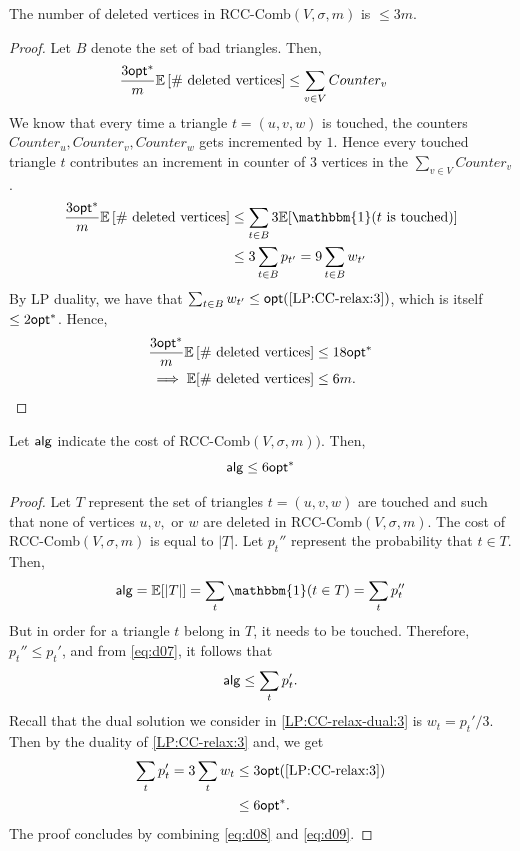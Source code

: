 \begin{lemma}\label{RCC:l3}
The number of deleted vertices in {\sf RCC-Comb}$(V,\sigma,m)$ is $\leq 3m$.
\end{lemma}
\begin{proof}
Let $B$ denote the set of bad triangles. Then,
\begin{align}
    \frac{3\mathsf{opt}^*}{m} \mathbb{E}\left[\# \text{ deleted vertices}\right] &\leq \sum_{v\in V}Counter_v \nonumber
\end{align}
We know that every time a triangle $t=(u,v,w)$ is touched, the counters $Counter_u, Counter_v, Counter_w$ gets incremented by $1$. Hence every touched triangle $t$ contributes an increment in counter of $3$ vertices in the $\sum_{v\in V}Counter_v$.
\begin{align}
    \frac{3\opt^*}{m} \mathbb{E}\left[\# \text{ deleted vertices}\right] &\leq \sum_{t\in B}3\mathbb{E}[\mathbbm{1}(t\text{ is touched})] \nonumber\\
    & \leq 3\sum_{t\in B}p_{t'} = 9\sum_{t\in B}w_{t'} \nonumber
\end{align}
By LP duality, we have that $\sum_{t\in B}w_{t'} \leq \mathsf{opt}(\ref{LP:CC-relax:3})$, which is itself $\leq 2\mathsf{opt}^*$. Hence,
\begin{align}
    \frac{3\mathsf{opt}^*}{m} \mathbb{E}\left[\# \text{ deleted vertices}\right] &\leq 18\mathsf{opt}^* \nonumber \\
    \implies \mathbb{E}[\# \text{ deleted vertices}] &\leq 6m. \nonumber
\end{align}
\end{proof}

\begin{lemma}\label{RCC:l4}
Let $\mathsf{alg}$ indicate the cost of {\sf RCC-Comb}$(V,\sigma,m))$. Then,
\begin{equation*}
    \mathsf{alg} \le 6\mathsf{opt}^*
\end{equation*}
\end{lemma}
\begin{proof}
Let $T$ represent the set of triangles $t = (u,v,w)$ are touched and such that none of vertices $u,v,$ or $w$ are deleted in {\sf RCC-Comb}$(V,\sigma,m)$. The cost of {\sf RCC-Comb}$(V,\sigma,m)$ is equal to $|T|$. Let $p_t''$ represent the probability that $t \in T$. Then,
\begin{equation}
    \alg = \mathbb{E}[|T|] = \sum_t \mathbbm{1} (t \in T) = \sum_{t} p_t'' \label{eq:d07}
\end{equation}
But in order for a triangle $t$ belong in $T$, it needs to be touched. Therefore, $p_t'' \leq p_t'$, and from \eqref{eq:d07}, it follows that
\begin{equation} \label{eq:d08}
\mathsf{alg} \leq \sum_t p_t'.
\end{equation}
Recall that the dual solution we consider in \ref{LP:CC-relax-dual:3} is $w_t = p_t' / 3$. Then by the duality of \ref{LP:CC-relax:3} and, we get
\begin{align}
    \sum_t p_t' = 3 \sum_t w_t &\leq 3 \mathsf{opt} (\ref{LP:CC-relax:3})\nonumber\\
    &\le 6\mathsf{opt}^*. \label{eq:d09}
\end{align}
The proof concludes by combining \eqref{eq:d08} and \eqref{eq:d09}. 
\end{proof}


